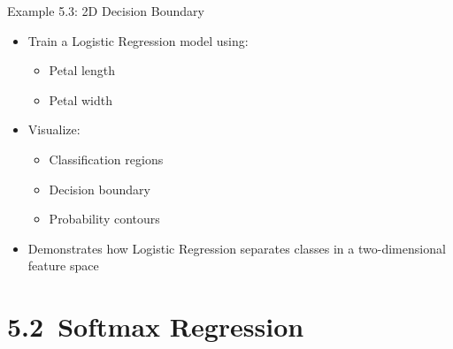 \documentclass[aspectratio=169]{beamer}
\begin{document}
\begin{frame}{Example 5.3: 2D Decision Boundary}

\begin{itemize}
\item Train a Logistic Regression model using:
\begin{itemize}
\item Petal length
\item Petal width
\end{itemize}

\vspace{0.5em}

\item Visualize:
\begin{itemize}
\item Classification regions
\item Decision boundary
\item Probability contours
\end{itemize}

\vspace{0.5em}

\item Demonstrates how Logistic Regression separates classes in a two-dimensional feature space
\end{itemize}

\end{frame}

\section{5.2~Softmax Regression}
\end{document}
